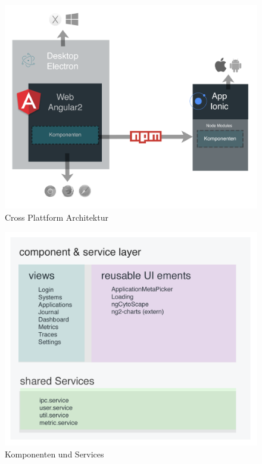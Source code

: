 \begin{figure}[h]
 \centering
 \includegraphics[width=\linewidth]{kapitel4/arch.png}
 \caption{Cross Plattform Architektur}
 \label{kapitel4/arch}
\end{figure}
\vspace{0.3cm}




\begin{figure}[h]
 \centering
 \includegraphics[width=\linewidth]{kapitel4/inner-arch.png}
 \caption{Komponenten und Services}
\end{figure}
\vspace{0.3cm}

